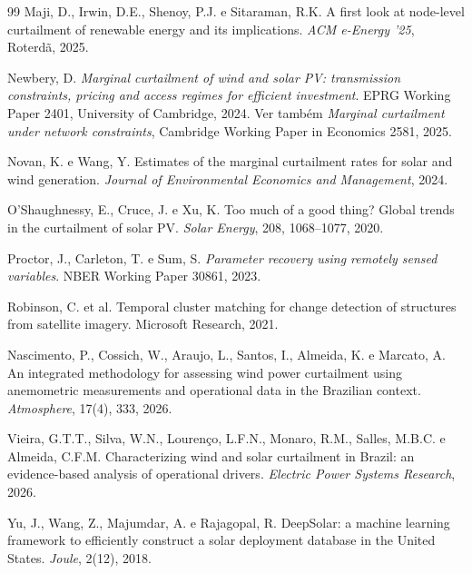 \begin{thebibliography}{99}
 Maji, D., Irwin, D.E., Shenoy, P.J. e Sitaraman, R.K. A first
  look at node-level curtailment of renewable energy and its implications.
  \emph{ACM e-Energy '25}, Roterdã, 2025.

 Newbery, D. \emph{Marginal curtailment of wind and solar
  PV: transmission constraints, pricing and access regimes for efficient
  investment}. EPRG Working Paper 2401, University of Cambridge, 2024.
  Ver também \emph{Marginal curtailment under network constraints}, Cambridge
  Working Paper in Economics 2581, 2025.

 Novan, K. e Wang, Y. Estimates of the marginal curtailment
  rates for solar and wind generation. \emph{Journal of Environmental Economics
  and Management}, 2024.

 O'Shaughnessy, E., Cruce, J. e Xu, K. Too much of a
  good thing? Global trends in the curtailment of solar PV. \emph{Solar Energy},
  208, 1068--1077, 2020.

 Proctor, J., Carleton, T. e Sum, S. \emph{Parameter
  recovery using remotely sensed variables}. NBER Working Paper 30861, 2023.

 Robinson, C. et al. Temporal cluster matching for change
  detection of structures from satellite imagery. Microsoft Research, 2021.

 Nascimento, P., Cossich, W., Araujo, L., Santos, I.,
  Almeida, K. e Marcato, A. An integrated methodology for assessing wind power
  curtailment using anemometric measurements and operational data in the
  Brazilian context. \emph{Atmosphere}, 17(4), 333, 2026.

 Vieira, G.T.T., Silva, W.N., Lourenço, L.F.N., Monaro,
  R.M., Salles, M.B.C. e Almeida, C.F.M. Characterizing wind and solar
  curtailment in Brazil: an evidence-based analysis of operational drivers.
  \emph{Electric Power Systems Research}, 2026.

 Yu, J., Wang, Z., Majumdar, A. e Rajagopal, R. DeepSolar: a
  machine learning framework to efficiently construct a solar deployment
  database in the United States. \emph{Joule}, 2(12), 2018.

\end{thebibliography}
